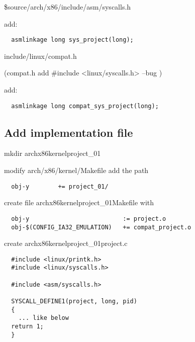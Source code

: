 	\$source/arch/x86/include/asm/syscalls.h
	
	add:
	
	\begin{verbatim}
  asmlinkage long sys_project(long);
	\end{verbatim}
	
	include/linux/compat.h
	
	(compat.h add \#include <linux/syscalls.h>    --bug )
	
    add:
    
   	\begin{verbatim}
  asmlinkage long compat_sys_project(long);
   	\end{verbatim}
   	
   	\subsection{Add implementation file}
   	
   	mkdir arch\/x86\/kernel\/project\_01
   	
   	modify arch/x86/kernel/Makefile add the path
    	\begin{verbatim}
  obj-y        += project_01/
    	\end{verbatim}  	
    	
    create file arch\/x86\/kernel\/project\_01\/Makefile with 
      	\begin{verbatim}
  obj-y                          := project.o
  obj-$(CONFIG_IA32_EMULATION)   += compat_project.o
      	\end{verbatim}    
      	
    create arch\/x86\/kernel\/project\_01\/project.c
    
		\begin{verbatim}
  #include <linux/printk.h>
  #include <linux/syscalls.h>

  #include <asm/syscalls.h>

  SYSCALL_DEFINE1(project, long, pid)
  {
    ... like below
  return 1;
  }
		\end{verbatim}   
		
